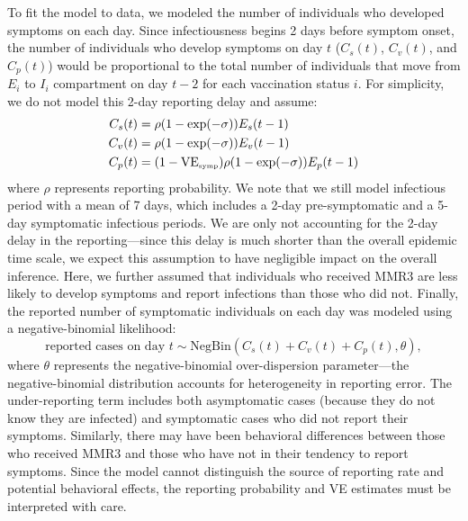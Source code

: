 \documentclass[12pt]{article}
\begin{document}
To fit the model to data, we modeled the number of individuals who developed symptoms on each day.
Since infectiousness begins 2 days before symptom onset, the number of individuals who develop symptoms on day $t$ ($C_s(t)$, $C_v(t)$, and $C_p(t)$) would be proportional to the total number of individuals that move from $E_i$ to $I_i$ compartment on day $t-2$ for each vaccination status $i$.
For simplicity, we do not model this 2-day reporting delay and assume:
\begin{align}
C_s(t) &= \rho (1-\exp(- \sigma)) E_s(t-1)\\
C_v(t) &= \rho (1-\exp(- \sigma)) E_v(t-1)\\
C_p(t) &= (1- \mathrm{VE}_{\textrm{\tiny{symp}}}) \rho (1-\exp(- \sigma)) E_p(t-1)
\end{align}
where $\rho$ represents reporting probability.
We note that we still model infectious period with a mean of 7 days, which includes a 2-day pre-symptomatic and a 5-day symptomatic infectious periods.
We are only not accounting for the 2-day delay in the reporting---since this delay is much shorter than the overall epidemic time scale, we expect this assumption to have negligible impact on the overall inference.
Here, we further assumed that individuals who received MMR3 are less likely to develop symptoms and report infections than those who did not.
Finally, the reported number of symptomatic individuals on each day was modeled using a negative-binomial likelihood:
\begin{equation}
\textrm{reported cases on day } t \sim \mathrm{NegBin}(C_s(t) + C_v(t) + C_p(t), \theta),
\end{equation}
where $\theta$ represents the negative-binomial over-dispersion parameter---the negative-binomial distribution accounts for heterogeneity in reporting error.
The under-reporting term includes both asymptomatic cases (because they do not know they are infected) and symptomatic cases who did not report their symptoms.
Similarly, there may have been behavioral differences between those who received MMR3 and those who have not in their tendency to report symptoms.
Since the model cannot distinguish the source of reporting rate and potential behavioral effects, the reporting probability and VE estimates must be interpreted with care.
\end{document}
